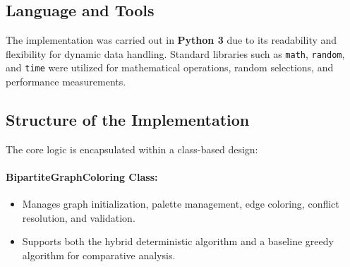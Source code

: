\documentclass[11pt]{article}
\begin{document}
\subsection*{Language and Tools}
The implementation was carried out in \textbf{Python 3} due to its readability and flexibility for dynamic data handling. Standard libraries such as \texttt{math}, \texttt{random}, and \texttt{time} were utilized for mathematical operations, random selections, and performance measurements.

\subsection*{Structure of the Implementation}
The core logic is encapsulated within a class-based design:

\paragraph{BipartiteGraphColoring Class:}
\begin{itemize}
    \item Manages graph initialization, palette management, edge coloring, conflict resolution, and validation.
    \item Supports both the hybrid deterministic algorithm and a baseline greedy algorithm for comparative analysis.
\end{itemize}
\end{document}
